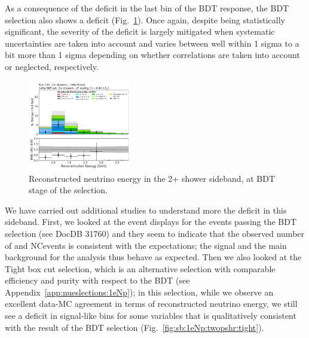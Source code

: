 As a consequence of the deficit in the last bin of the BDT response, the BDT selection also shows a deficit (Fig.~\ref{fig:sb:1eNp:twopshr:bdt:recoe}). Once again, despite being statistically significant, the severity of the deficit is largely mitigated when systematic uncertainties are taken into account and varies between well within 1 sigma to a bit more than 1 sigma depending on whether correlations are taken into account or neglected, respectively. 

\begin{figure}[H]
    \begin{center}
    \includegraphics[width=0.4\textwidth]{Sidebands/Figures/1eNp/TwoShower/TwoPShr_NP_NPBDTAllShr_pi0e040/reco_e_coarse.pdf}
    \caption{\label{fig:sb:1eNp:twopshr:bdt:recoe} Reconstructed neutrino energy in the 2+ shower sideband, at BDT stage of the \npsel selection.}
    \end{center}
\end{figure}

We have carried out additional studies to understand more the deficit in this sideband. First, we looked at the event displays for the events passing the BDT selection (see DocDB 31760) and they seem to indicate that the observed number of \npsel and NC\pizero events is consistent with the expectations; the signal and the main background for the analysis thus behave as expected. Then we also looked at the Tight box cut selection, which is an alternative selection with comparable efficiency and purity with respect to the BDT (see Appendix~\ref{app:nueslections:1eNp}); in this selection, while we observe an excellent data-MC agreement in terms of reconstructed neutrino energy, we still see a deficit in signal-like bins for some variables that is qualitatively consistent with the result of the BDT selection (Fig.~\ref{fig:sb:1eNp:twopshr:tight}).

